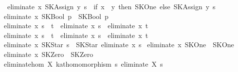 \begin{isabellebody}
\ \ {}eliminate\ x\ {}SKAssign\ y\ s{}\ {}\ {}if\ x\ {}\ y\ then\ SKOne\ else\ {}SKAssign\ y\ s{}{}{}\isanewline
{}\ {}eliminate\ x\ {}SKBool\ p{}\ {}\ {}SKBool\ p{}{}\isanewline
{}\ {}eliminate\ x\ {}s\ {}\ t{}\ {}\ eliminate\ x\ s\ {}\ eliminate\ x\ t{}\isanewline
{}\ {}eliminate\ x\ {}s\ {}\ t{}\ {}\ eliminate\ x\ s\ {}\ eliminate\ x\ t{}\isanewline
{}\ {}eliminate\ x\ {}SKStar\ s{}\ {}\ SKStar\ {}eliminate\ x\ s{}{}\isanewline
{}\ {}eliminate\ x\ SKOne\ {}\ SKOne{}\isanewline
{}\ {}eliminate\ x\ SKZero\ {}\ SKZero{}\isanewline
\isanewline
{}\isamarkupfalse%
\ eliminate{}hom{}\ {}{}X{}\ kat{}homomorphism\ {}{}s{}\ {}eliminate\ X\ s{}{}{}\isanewline

\end{isabellebody}
